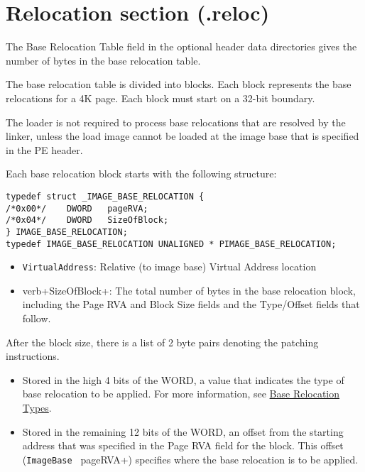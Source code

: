\section{Relocation section (.reloc)}

The Base Relocation Table field in the optional header data directories gives the number of bytes in the base relocation table.

The base relocation table is divided into blocks. Each block represents the base relocations for a 4K page. Each block must start on a 32-bit boundary.

The loader is not required to process base relocations that are resolved by the linker, unless the load image cannot be loaded at the image base that is specified in the PE header.

Each base relocation block starts with the following structure:

\begin{verbatim}
typedef struct _IMAGE_BASE_RELOCATION {
/*0x00*/    DWORD   pageRVA;
/*0x04*/    DWORD   SizeOfBlock;
} IMAGE_BASE_RELOCATION;
typedef IMAGE_BASE_RELOCATION UNALIGNED * PIMAGE_BASE_RELOCATION;
\end{verbatim}

\begin{itemize}
    \item \verb+VirtualAddress+: Relative (to image base) Virtual Address location 
    \item verb+SizeOfBlock+: The total number of bytes in the base relocation block, including the Page RVA and Block Size fields and the Type/Offset fields that follow. 
\end{itemize}

After the block size, there is a list of 2 byte pairs denoting the patching instructions.

\begin{itemize}
    \item Stored in the high 4 bits of the WORD, a value that indicates the type of base relocation to be applied. For more information, see \href{https://learn.microsoft.com/en-us/windows/win32/debug/pe-format#base-relocation-types}{Base Relocation Types}.
    \item Stored in the remaining 12 bits of the WORD, an offset from the starting address that was specified in the Page RVA field for the block. This offset (\verb+ImageBase + pageRVA+) specifies where the base relocation is to be applied. 
\end{itemize}

